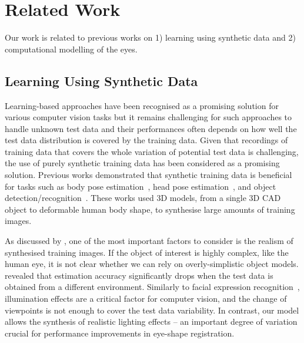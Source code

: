 
\section{Related Work}

Our work is related to previous works on 1) learning using synthetic data and 2) computational modelling of the eyes.

\subsection{Learning Using Synthetic Data}

Learning-based approaches have been recognised as a promising solution for various computer vision tasks
but it remains challenging for such approaches to handle unknown test data and their performances often depends on how well the test data distribution is covered by the training data.
Given that recordings of training data that covers the whole variation of potential test data is challenging,
the use of purely synthetic training data has been considered as a promising solution.
Previous works demonstrated that synthetic training data is beneficial for tasks such as body pose estimation~\cite{shakhnarovich2003fast,okada2008relevant,shotton2013real}, head pose estimation~\cite{fanelli2011real}, and object detection/recognition~\cite{yu2010improving,liebelt2010multiview,jaderberg2014synthetic}.
These works used 3D models, from a single 3D CAD object to deformable human body shape, to synthesise large amounts of training images.

As discussed by \citet{kaneva2011evaluation}, one of the most important factors to consider is the realism of synthesised training images.
If the object of interest is highly complex, like the human eye, it is not clear whether we can rely on overly-simplistic object models.
\citet{zhang15_cvpr} revealed that estimation accuracy significantly drops when the test data is obtained from a different environment.
Similarly to facial expression recognition~\cite{stratou2011effect}, illumination effects are a critical factor for computer vision, and the change of viewpoints is not enough to cover the test data variability.
In contrast, our model allows the synthesis of realistic lighting effects -- an important degree of variation crucial for performance improvements in eye-shape registration.

